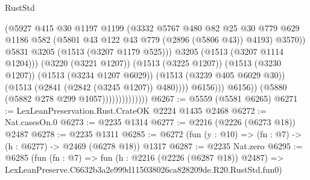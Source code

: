 \begin{lexlean}{RustStd}
\begin{coremodule}
                                              (@5927
                                                @415
                                                @30
                                                @1197
                                                @1199
                                                (@3332
                                                  @5767
                                                  @480
                                                  @82
                                                  @25
                                                  @30
                                                  @779
                                                  @629
                                                  @1186
                                                  @582
                                                  (@5801
                                                    @43
                                                    @122
                                                    @43
                                                    @779
                                                    (@2896 (@5806 @43))
                                                    @4193)
                                                  @3570))
                                              @5831
                                              @3205
                                              (@1513 (@3207 @1179 @525)))
                                            @3205
                                            (@1513 (@3207 @1114 @1204)))
                                          (@3220 (@3221 @1207))
                                          (@1513 (@3225 @1207))
                                          (@1513 (@3230 @1207))
                                          (@1513 (@3234 @1207 @6029))
                                          (@1513 (@3239 @405 @6029 @30))
                                          (@1513 (@2841 (@2842 (@3245 @1207)) @480))))
                                      @6156)))
                                @6156))
                            (@5880 (@5882 @278 @299 @1057))))))))))))))
@6267 := @5559 (@5581 @6265)
@6271 := LexLeanPreservation.Rust.CrateOK @2224 @1435 @2468
@6272 := Nat.casesOn.{0}
@6273 := @2235 @1314
@6277 := @2216 (@2226 (@6273 @18)) @2487
@6278 := @2235 @1311
@6285 := @6272 (fun (y : @10) => (fn : @7) -> (h : @6277) -> @2469 (@6278 @18)) @1317
@6287 := @2235 Nat.zero
@6295 := @6285
    (fun (fn : @7) =>
    fun (h : @2216 (@2226 (@6287 @18)) @2487) =>
    LexLeanPreserve.C6632b3a2e999d115038026ca828209de.R20.RustStd.fun0)

\end{coremodule}
\end{lexlean}
